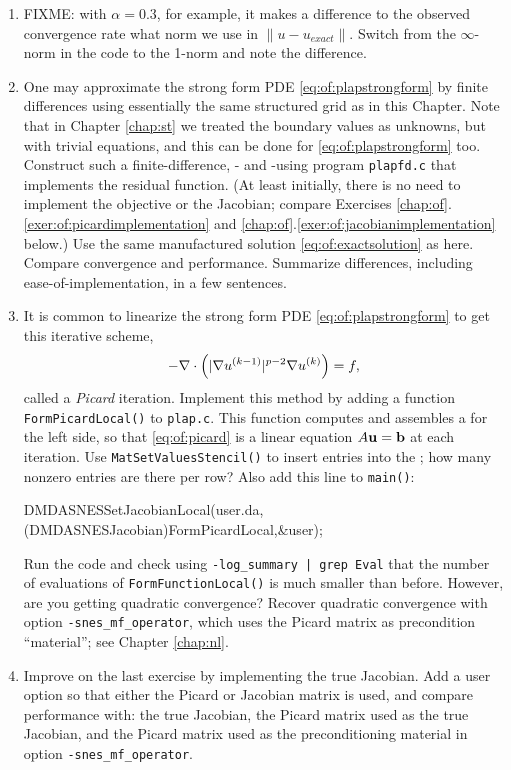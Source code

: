 \begin{enumerate}
\item FIXME: with $\alpha=0.3$, for example, it makes a difference to the observed convergence rate what norm we use in $\|u-u_{exact}\|$.  Switch from the $\infty$-norm in the code to the 1-norm and note the difference.

\item One may approximate the strong form PDE \eqref{eq:of:plapstrongform} by finite differences using essentially the same structured grid as in this Chapter.  Note that in Chapter \ref{chap:st} we treated the boundary values as unknowns, but with trivial equations, and this can be done for \eqref{eq:of:plapstrongform} too.  Construct such a finite-difference, \pSNES- and \pDMDA-using program \texttt{plapfd.c} that implements the residual function.  (At least initially, there is no need to implement the objective or the Jacobian; compare Exercises \ref{chap:of}.\ref{exer:of:picardimplementation} and \ref{chap:of}.\ref{exer:of:jacobianimplementation} below.)  Use the same manufactured solution \eqref{eq:of:exactsolution} as here.  Compare convergence and performance.  Summarize differences, including ease-of-implementation, in a few sentences.

\item \label{exer:of:picardimplementation}  It is common to linearize the strong form PDE \eqref{eq:of:plapstrongform} to get this iterative scheme,
\begin{equation}
- \nabla\cdot\left(|\nabla u^{(k-1)}|^{p-2} \nabla u^{(k)}\right) = f,
\label{eq:of:picard}
\end{equation}
called a \emph{Picard} iteration.  Implement this method by adding a function \texttt{FormPicardLocal()} to \texttt{plap.c}.  This function computes and assembles a \pMat for the left side, so that \eqref{eq:of:picard} is a linear equation $A\mathbf{u} = \mathbf{b}$ at each iteration.  Use \texttt{MatSetValuesStencil()} to insert entries into the \pMat; how many nonzero entries are there per row?  Also add this line to \texttt{main()}:
\begin{code}
    DMDASNESSetJacobianLocal(user.da,
            (DMDASNESJacobian)FormPicardLocal,&user);
\end{code}
Run the code and check using \texttt{-log\_summary | grep Eval} that the number of evaluations of \texttt{FormFunctionLocal()} is much smaller than before.  However, are you getting quadratic convergence?  Recover quadratic convergence with option \texttt{-snes\_mf\_operator}, which uses the Picard matrix as precondition ``material''; see Chapter \ref{chap:nl}.

\item \label{exer:of:jacobianimplementation}  Improve on the last exercise by implementing the true Jacobian.  Add a user option so that either the Picard or Jacobian matrix is used, and compare performance with: the true Jacobian, the Picard matrix used as the true Jacobian, and the Picard matrix used as the preconditioning material in option \texttt{-snes\_mf\_operator}.

\end{enumerate}

